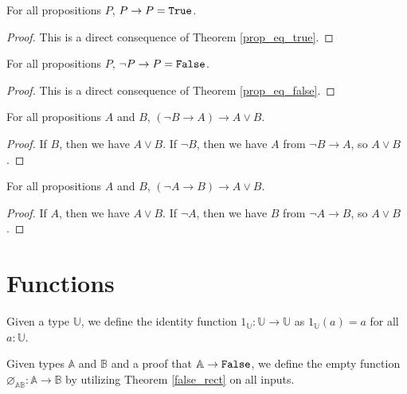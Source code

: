 \documentclass[../../math.tex]{subfiles}
\begin{document}
\begin{theorem} \label{prop_is_true}
    For all propositions $P$, $P \to P = \verb|True|$.
\end{theorem}
\begin{proof}
    This is a direct consequence of Theorem \ref{prop_eq_true}.
\end{proof}

\begin{theorem} \label{prop_is_false}
    For all propositions $P$, $\neg P \to P = \verb|False|$.
\end{theorem}
\begin{proof}
    This is a direct consequence of Theorem \ref{prop_eq_false}.
\end{proof}

\begin{theorem} \label{or_left}
    For all propositions $A$ and $B$, $(\neg B \to A) \to A \vee B$.
\end{theorem}
\begin{proof}
    If $B$, then we have $A \vee B$.  If $\neg B$, then we have $A$ from $\neg B
    \to A$, so $A \vee B$.
\end{proof}

\begin{theorem} \label{or_right}
    For all propositions $A$ and $B$, $(\neg A \to B) \to A \vee B$.
\end{theorem}
\begin{proof}
    If $A$, then we have $A \vee B$.  If $\neg A$, then we have $B$ from $\neg A
    \to B$, so $A \vee B$.
\end{proof}

\section{Functions}

\begin{definition}
    Given a type $\mathbb U$, we define the identity function $1_\mathbb U :
    \mathbb U \rightarrow \mathbb U$ as $1_\mathbb U(a) = a$ for all $a :
    \mathbb U$.
\end{definition}

\begin{definition}
    Given types $\mathbb A$ and $\mathbb B$ and a proof that $\mathbb A
    \rightarrow \vtt{False}$, we define the empty function $\varnothing_{\mathbb
    A \mathbb B} : \mathbb A \rightarrow \mathbb B$ by utilizing Theorem
    \ref{false_rect} on all inputs.
\end{definition}
\end{document}
